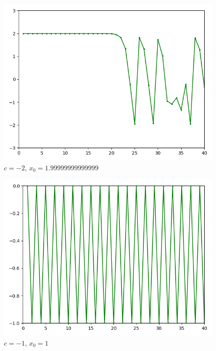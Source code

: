 \documentclass[]{article}
\begin{document}
\begin{figure}[!htbp]
	\includegraphics[scale=1]{task6-21,999.png}
	\centering
	\caption{$c = -2$, $x_0 = 1.99999999999999$}
\end{figure}
\begin{figure}[!htbp]
	\includegraphics[scale=1]{task6-11}
	\centering
	\caption{$c = -1$, $x_0 = 1$}
\end{figure}
\end{document}
